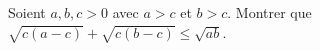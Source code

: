 Soient $a, b, c > 0$ avec $a > c$ et $b > c$. Montrer que $\sqrt{c(a - c)} + \sqrt{c(b - c)} \leq \sqrt{ab}$.
